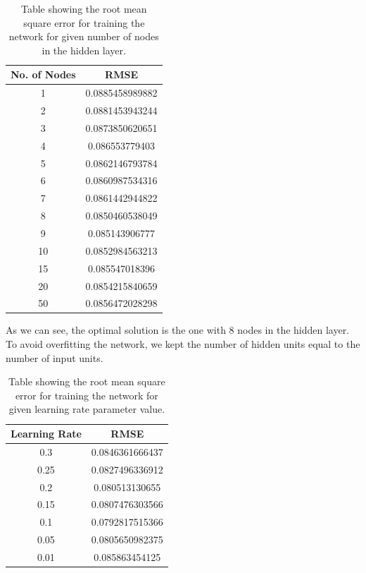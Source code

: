 \begin{table}
\begin{center}
\begin{tabular}{| c | c |} \hline 
  No. of Nodes & RMSE  \\ \hline \hline
  1 &  0.0885458989882 \\ \hline
  2 &  0.0881453943244 \\ \hline
  3 &  0.0873850620651 \\ \hline
  4 &  0.086553779403   \\ \hline
  5 &  0.0862146793784 \\ \hline
  6 &  0.0860987534316 \\ \hline
  7 &  0.0861442944822 \\ \hline
  8 &  0.0850460538049 \\ \hline
  9 &  0.085143906777   \\ \hline
 10 & 0.0852984563213 \\ \hline
 15 & 0.085547018396   \\ \hline
 20 & 0.0854215840659 \\ \hline
 50 & 0.0856472028298 \\ \hline
\end{tabular}
\caption{Table showing the root mean square error for training the network for given number of nodes in the hidden layer.}
\label{table:rsmetable}
\end{center}
\end{table}

As we can see, the optimal solution is the one with 8 nodes in the hidden layer. To avoid overfitting the network, we kept the number of hidden units equal to the number of input units. 

\begin{table}
\begin{center}
\begin{tabular} {| c | c |} \hline
 Learning Rate & RMSE \\  \hline \hline
 0.3 & 0.0846361666437 \\ \hline
 0.25 & 0.0827496336912 \\ \hline
 0.2 & 0.080513130655 \\ \hline
 0.15 & 0.0807476303566 \\ \hline
 0.1 & 0.0792817515366 \\ \hline
 0.05 & 0.0805650982375 \\ \hline
 0.01 & 0.085863454125 \\ \hline
\end{tabular}
\caption{Table showing the root mean square error for training the network for given learning rate parameter value.}
\label{table:learningrate}
\end{center}
\end{table}


